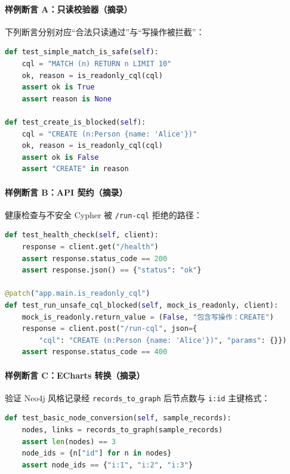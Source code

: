 \documentclass[12pt,a4paper]{article}
\begin{document}
\paragraph{样例断言 A：只读校验器（摘录）}
下列断言分别对应“合法只读通过”与“写操作被拦截”：

\begin{lstlisting}[language=Python, caption={tests/test\_cql\_validator.py 摘录}]
def test_simple_match_is_safe(self):
    cql = "MATCH (n) RETURN n LIMIT 10"
    ok, reason = is_readonly_cql(cql)
    assert ok is True
    assert reason is None

def test_create_is_blocked(self):
    cql = "CREATE (n:Person {name: 'Alice'})"
    ok, reason = is_readonly_cql(cql)
    assert ok is False
    assert "CREATE" in reason
\end{lstlisting}

\paragraph{样例断言 B：API 契约（摘录）}
健康检查与不安全 Cypher 被 \texttt{/run-cql} 拒绝的路径：

\begin{lstlisting}[language=Python, caption={tests/test\_api.py 摘录}]
def test_health_check(self, client):
    response = client.get("/health")
    assert response.status_code == 200
    assert response.json() == {"status": "ok"}

@patch("app.main.is_readonly_cql")
def test_run_unsafe_cql_blocked(self, mock_is_readonly, client):
    mock_is_readonly.return_value = (False, "包含写操作：CREATE")
    response = client.post("/run-cql", json={
        "cql": "CREATE (n:Person {name: 'Alice'})", "params": {}})
    assert response.status_code == 400
\end{lstlisting}

\paragraph{样例断言 C：ECharts 转换（摘录）}
验证 Neo4j 风格记录经 \texttt{records\_to\_graph} 后节点数与 \texttt{i:id} 主键格式：

\begin{lstlisting}[language=Python, caption={tests/test\_echarts\_converter.py 摘录}]
def test_basic_node_conversion(self, sample_records):
    nodes, links = records_to_graph(sample_records)
    assert len(nodes) == 3
    node_ids = {n["id"] for n in nodes}
    assert node_ids == {"i:1", "i:2", "i:3"}
\end{lstlisting}
\end{document}
